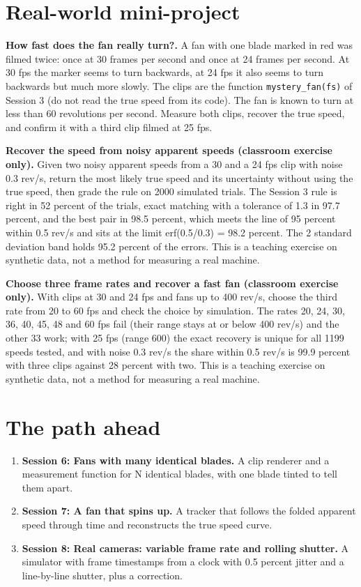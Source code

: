 \documentclass[11pt,a4paper]{article}
\begin{document}
\section{Real-world mini-project}
\textbf{How fast does the fan really turn?.} A fan with one blade marked in red was filmed twice: once at 30 frames per second and once at 24 frames per second. At 30 fps the marker seems to turn backwards, at 24 fps it also seems to turn backwards but much more slowly. The clips are the function \texttt{mystery\_fan(fs)} of Session 3 (do not read the true speed from its code). The fan is known to turn at less than 60 revolutions per second. Measure both clips, recover the true speed, and confirm it with a third clip filmed at 25 fps.

\textbf{Recover the speed from noisy apparent speeds (classroom exercise only).} Given two noisy apparent speeds from a 30 and a 24 fps clip with noise 0.3 rev/s, return the most likely true speed and its uncertainty without using the true speed, then grade the rule on 2000 simulated trials. The Session 3 rule is right in 52 percent of the trials, exact matching with a tolerance of 1.3 in 97.7 percent, and the best pair in 98.5 percent, which meets the line of 95 percent within 0.5 rev/s and sits at the limit erf(0.5/0.3) = 98.2 percent. The 2 standard deviation band holds 95.2 percent of the errors. This is a teaching exercise on synthetic data, not a method for measuring a real machine.

\textbf{Choose three frame rates and recover a fast fan (classroom exercise only).} With clips at 30 and 24 fps and fans up to 400 rev/s, choose the third rate from 20 to 60 fps and check the choice by simulation. The rates 20, 24, 30, 36, 40, 45, 48 and 60 fps fail (their range stays at or below 400 rev/s) and the other 33 work; with 25 fps (range 600) the exact recovery is unique for all 1199 speeds tested, and with noise 0.3 rev/s the share within 0.5 rev/s is 99.9 percent with three clips against 28 percent with two. This is a teaching exercise on synthetic data, not a method for measuring a real machine.

\section{The path ahead}
\begin{enumerate}[nosep]
\item \textbf{Session 6: Fans with many identical blades.} A clip renderer and a measurement function for N identical blades, with one blade tinted to tell them apart.
\item \textbf{Session 7: A fan that spins up.} A tracker that follows the folded apparent speed through time and reconstructs the true speed curve.
\item \textbf{Session 8: Real cameras: variable frame rate and rolling shutter.} A simulator with frame timestamps from a clock with 0.5 percent jitter and a line-by-line shutter, plus a correction.
\end{enumerate}
\end{document}

